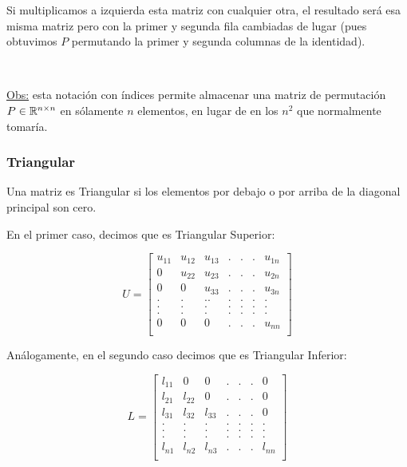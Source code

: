 Si multiplicamos a izquierda esta matriz con cualquier otra, el resultado será esa misma matriz pero con la primer y segunda fila cambiadas de lugar (pues obtuvimos $P$ permutando la primer y segunda columnas de la identidad).

~\newline

\underline{Obs:} esta notación con índices permite almacenar una matriz de permutación $P\in\mathbb{R}^{n\times n}$ en sólamente $n$ elementos, en lugar de en los $n^2$ que normalmente tomaría.

\subsubsection{Triangular}
Una matriz es Triangular si los elementos por debajo o por arriba de la diagonal principal son cero.

En el primer caso, decimos que es Triangular Superior:

\begin{equation*}
	U =
	\left [ \begin{array}{ccccccc}
	  u_{11} & u_{12} & u_{13} & . & . & .& u_{1n}\\
	  0 & u_{22} & u_{23} & . & . & .& u_{2n}\\
	  0 & 0 & u_{33} & . & . & .& u_{3n}\\
	. & . & .. & . & . & .& .\\
	. & . & . & . & . & .& .\\
	. & . & . & . & . & .& .\\
	0 & 0 & 0 & . & . & .& u_{nn}\\
	\end{array} \right ]
\end{equation*}

Análogamente, en el segundo caso decimos que es Triangular Inferior:

\begin{equation*}
	L =
	\left [ \begin{array}{ccccccc}
	  l_{11} & 0 & 0 & . & . & .& 0\\
	  l_{21} & l_{22} & 0 & . & . & .& 0\\
	  l_{31} & l_{32} & l_{33} & . & . & .& 0\\
	. & . & . & . & . & .& .\\
	. & . & . & . & . & .& .\\
	. & . & . & . & . & .& .\\
	l_{n1} & l_{n2} & l_{n3} & . & . & .& l_{nn}\\
	\end{array} \right ]
\end{equation*}

